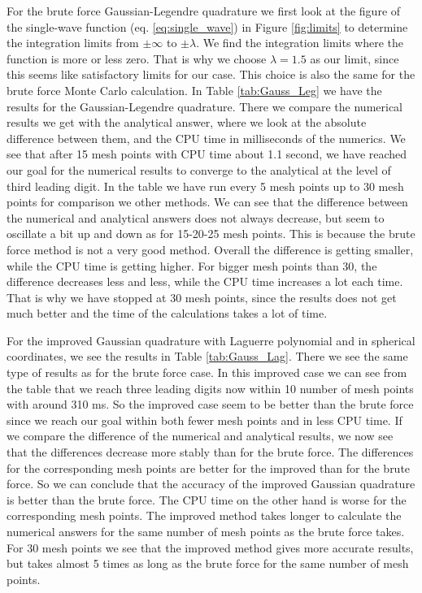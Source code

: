 \documentclass[12pt,a4paper,english]{article}
\begin{document}
For the brute force Gaussian-Legendre quadrature we first look at the figure of the single-wave function (eq. \ref{eq:single_wave}) in Figure \ref{fig:limits} to determine the integration limits from $\pm\infty$ to $\pm\lambda$. We find the integration limits where the function is more or less zero. That is why we choose $\lambda=1.5$ as our limit, since this seems like satisfactory limits for our case. This choice is also the same for the brute force Monte Carlo calculation. In Table \ref{tab:Gauss_Leg} we have the results for the Gaussian-Legendre quadrature. There we compare the numerical results we get with the analytical answer, where we look at the absolute difference between them, and the CPU time in milliseconds of the numerics. We see that after 15 mesh points with CPU time about 1.1 second, we have reached our goal for the numerical results to converge to the analytical at the level of third leading digit. In the table we have run every 5 mesh points up to 30 mesh points for comparison we other methods. We can see that the difference between the numerical and analytical answers does not always decrease, but seem to oscillate a bit up and down as for 15-20-25 mesh points. This is because the brute force method is not a very good method. Overall the difference is getting smaller, while the CPU time is getting higher. For bigger mesh points than 30, the difference decreases less and less, while the CPU time increases a lot each time. That is why we have stopped at 30 mesh points, since the results does not get much better and the time of the calculations takes a lot of time. 

For the improved Gaussian quadrature with Laguerre polynomial and in spherical coordinates, we see the results in Table \ref{tab:Gauss_Lag}. There we see the same type of results as for the brute force case. In this improved case we can see from the table that we reach three leading digits now within 10 number of mesh points with around 310 ms. So the improved case seem to be better than the brute force since we reach our goal within both fewer mesh points and in less CPU time. If we compare the difference of the numerical and analytical results, we now see that the differences decrease more stably than for the brute force. The differences for the corresponding mesh points are better for the improved than for the brute force. So we can conclude that the accuracy of the improved Gaussian quadrature is better than the brute force. The CPU time on the other hand is worse for the corresponding mesh points. The improved method takes longer to calculate the numerical answers for the same number of mesh points as the brute force takes. For 30 mesh points we see that the improved method gives more accurate results, but takes almost 5 times as long as the brute force for the same number of mesh points.
\end{document}
